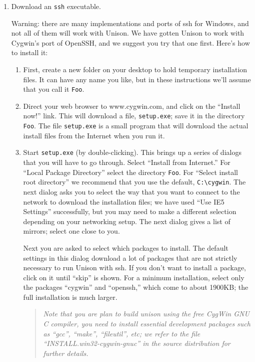 \documentclass{article}
\begin{document}
\begin{enumerate}
\item Download an \verb|ssh| executable.

Warning: there are many implementations and ports of ssh for
Windows, and not all of them will work with Unison.  We have gotten
Unison to work with Cygwin's port of OpenSSH, and we suggest you try
that one first.  Here's how to install it:
\begin{enumerate}
\item First, create a new folder on your desktop to hold temporary
  installation files.  It can have any name you like, but in these
  instructions we'll assume that you call it \verb|Foo|.
\item Direct your web browser to www.cygwin.com, and click on the
  ``Install now!'' link.  This will download a file, \verb|setup.exe|;
  save it in the directory \verb|Foo|.  The file \verb|setup.exe| is a
  small program that will download the actual install files from
  the Internet when you run it.
\item Start \verb|setup.exe| (by double-clicking).  This brings up a
  series of dialogs that you will have to go through.  Select
  ``Install from Internet.''  For ``Local Package Directory'' select
  the directory \verb|Foo|.  For ``Select install root directory'' we
  recommend that you use the default, \verb|C:\cygwin|.  The next
  dialog asks you to select the way that you want to connect to the
  network to download the installation files; we have used ``Use IE5
  Settings'' successfully, but you may need to make a different
  selection depending on your networking setup.  The next dialog gives
  a list of mirrors; select one close to you.

  Next you are asked to select which packages to install.  The default
  settings in this dialog download a lot of packages that are not
  strictly necessary to run Unison with ssh.  If you don't want to
  install a package, click on it until ``skip'' is shown.  For a
  minimum installation, select only the packages ``cygwin'' and
  ``openssh,'' which come to about 1900KB; the full installation is
  much larger.

  \begin{quote} \em Note that you are plan to build unison using the free
    CygWin GNU C compiler, you need to install essential development
    packages such as ``gcc'', ``make'', ``fileutil'', etc; we refer to
    the file ``INSTALL.win32-cygwin-gnuc'' in the source distribution
    for further details.
  \end{quote}


\end{enumerate}
\end{enumerate}
\end{document}
